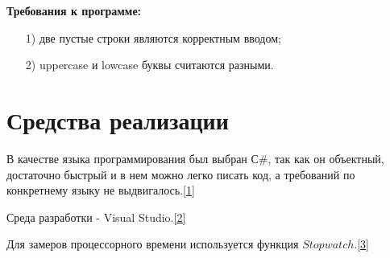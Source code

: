 \documentclass[12pt]{report}
\begin{document}
	\noindent\textbf{Требования к программе:}
	\begin{enumerate}
		\item[1)] две пустые строки являются корректным вводом; 
		\item[2)] uppercase и lowcase буквы считаются разными.
	\end{enumerate}
	
	\section{Средства реализации}
	В качестве языка программирования был выбран С\#, так как он объектный, достаточно быстрый и в нем можно легко писать код, а требований по конкретнему языку не выдвигалось.\hyperref[literature]{[1]}
	\par Среда разработки - Visual Studio.\hyperref[literature]{[2]}
	
	Для замеров процессорного времени используется функция $Stopwatch$.\hyperref[literature]{[3]}
	 
\end{document}
